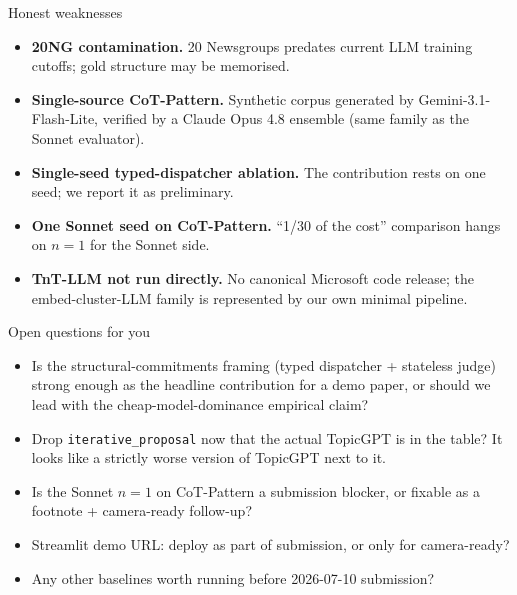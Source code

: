 \documentclass[10pt,aspectratio=169]{beamer}
\begin{document}
\begin{frame}{Honest weaknesses}
  \begin{itemize}\itemsep0.4em
    \item \textbf{20NG contamination.} 20 Newsgroups predates current
          LLM training cutoffs; gold structure may be memorised.
    \item \textbf{Single-source CoT-Pattern.} Synthetic corpus
          generated by Gemini-3.1-Flash-Lite, verified by a Claude
          Opus 4.8 ensemble (same family as the Sonnet evaluator).
    \item \textbf{Single-seed typed-dispatcher ablation.} The
          contribution rests on one seed; we report it as
          preliminary.
    \item \textbf{One Sonnet seed on CoT-Pattern.} ``1/30 of the
          cost'' comparison hangs on $n{=}1$ for the Sonnet side.
    \item \textbf{TnT-LLM not run directly.} No canonical Microsoft
          code release; the embed-cluster-LLM family is represented
          by our own minimal pipeline.
  \end{itemize}
\end{frame}

\begin{frame}{Open questions for you}
  \begin{itemize}\itemsep0.5em
    \item Is the structural-commitments framing (typed dispatcher +
          stateless judge) strong enough as the headline contribution
          for a demo paper, or should we lead with the
          cheap-model-dominance empirical claim?
    \item Drop \texttt{iterative\_proposal} now that the actual
          TopicGPT is in the table? It looks like a strictly worse
          version of TopicGPT next to it.
    \item Is the Sonnet $n{=}1$ on CoT-Pattern a submission blocker,
          or fixable as a footnote + camera-ready follow-up?
    \item Streamlit demo URL: deploy as part of submission, or only
          for camera-ready?
    \item Any other baselines worth running before 2026-07-10
          submission?
  \end{itemize}
\end{frame}
\end{document}
